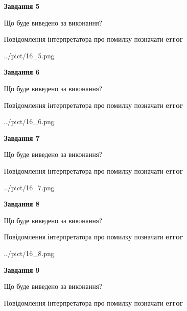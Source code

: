 \documentclass[11pt, ukrainian]{article}
\begin{document}
{\begin {large}
{\begin {center}\textbf{Завдання 5}\end {center}}\par
Що буде виведено за виконання? \par
Повідомлення інтерпретатора про помилку позначати \textbf{error}

\begin{center}
	{../pict/16_5.png}
\end{center}
\newpage

{\begin {center}\textbf{Завдання 6}\end {center}}\par
Що буде виведено за виконання? \par
Повідомлення інтерпретатора про помилку позначати \textbf{error}

\begin{center}
	{../pict/16_6.png}
\end{center}
\newpage

{\begin {center}\textbf{Завдання 7}\end {center}}\par
Що буде виведено за виконання? \par
Повідомлення інтерпретатора про помилку позначати \textbf{error}

\begin{center}
	{../pict/16_7.png}
\end{center}
\newpage

{\begin {center}\textbf{Завдання 8}\end {center}}\par
Що буде виведено за виконання? \par
Повідомлення інтерпретатора про помилку позначати \textbf{error}

\begin{center}
	{../pict/16_8.png}
\end{center}
\newpage

{\begin {center}\textbf{Завдання 9}\end {center}}\par
Що буде виведено за виконання? \par
Повідомлення інтерпретатора про помилку позначати \textbf{error}


\end{large}}
\end{document}
